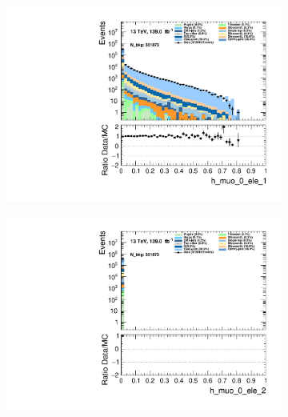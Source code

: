\begin{figure}
\begin{subfigure}{.49\textwidth}
        \includegraphics[width=\textwidth]{Figures/MC_Data_comp/h_muo_0_ele_1.pdf}
        \caption{ }
        \label{fig:h_muo_0_ele_1}
    \end{subfigure}
    \hfill
    \begin{subfigure}{.49\textwidth}
        \includegraphics[width=\textwidth]{Figures/MC_Data_comp/h_muo_0_ele_2.pdf}
        \caption{ }
        \label{fig:h_muo_0_ele_2}
    \end{subfigure}
    \hfill       
    \caption{}
    \label{fig:t}
\end{figure}


